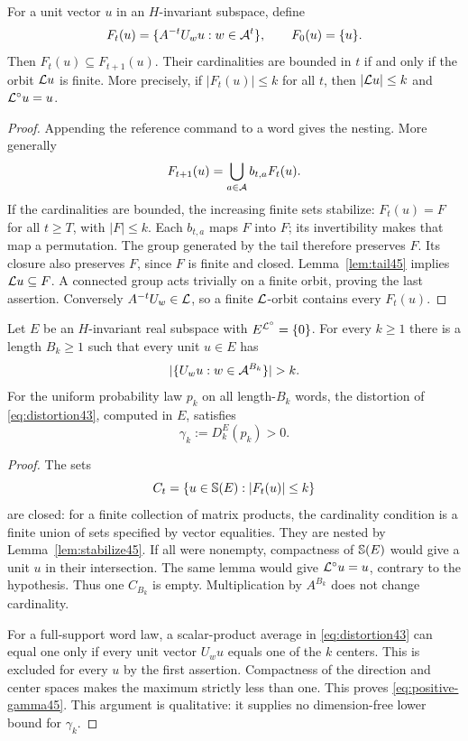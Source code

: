 \begin{lemma}\label{lem:stabilize45}
For a unit vector $u$ in an $H$-invariant subspace, define
\[
 F_t(u)=\{A^{-t}U_wu:w\in\mathcal A^t\},\qquad F_0(u)=\{u\}.
\]
Then $F_t(u)\subseteq F_{t+1}(u)$. Their cardinalities are bounded in $t$ if and only if the orbit $\mathcal L u$ is finite. More precisely, if $|F_t(u)|\le k$ for all $t$, then $|\mathcal L u|\le k$ and $\mathcal L^\circ u=u$.
\end{lemma}
\begin{proof}
Appending the reference command to a word gives the nesting. More generally
\begin{equation}\label{eq:normalized-recursion45}
 F_{t+1}(u)=\bigcup_{a\in\mathcal A}b_{t,a}F_t(u).
\end{equation}
If the cardinalities are bounded, the increasing finite sets stabilize: $F_t(u)=F$ for all $t\ge T$, with $|F|\le k$. Each $b_{t,a}$ maps $F$ into $F$; its invertibility makes that map a permutation. The group generated by the tail therefore preserves $F$. Its closure also preserves $F$, since $F$ is finite and closed. Lemma~\ref{lem:tail45} implies $\mathcal L u\subseteq F$. A connected group acts trivially on a finite orbit, proving the last assertion. Conversely $A^{-t}U_w\in\mathcal L$, so a finite $\mathcal L$-orbit contains every $F_t(u)$.
\end{proof}

\begin{lemma}\label{lem:positive-packet45}
Let $E$ be an $H$-invariant real subspace with $E^{\mathcal L^\circ}=\{0\}$. For every $k\ge1$ there is a length $B_k\ge1$ such that every unit $u\in E$ has
\[
 |\{U_wu:w\in\calA^{B_k}\}|>k.
\]
For the uniform probability law $p_k$ on all length-$B_k$ words, the distortion of \eqref{eq:distortion43}, computed in $E$, satisfies
\begin{equation}\label{eq:positive-gamma45}
 \gamma_k:=D_k^E(p_k)>0.
\end{equation}
\end{lemma}
\begin{proof}
The sets
\[
 C_t=\{u\in\mathbb S(E):|F_t(u)|\le k\}
\]
are closed: for a finite collection of matrix products, the cardinality condition is a finite union of sets specified by vector equalities. They are nested by Lemma~\ref{lem:stabilize45}. If all were nonempty, compactness of $\mathbb S(E)$ would give a unit $u$ in their intersection. The same lemma would give $\mathcal L^\circ u=u$, contrary to the hypothesis. Thus one $C_{B_k}$ is empty. Multiplication by $A^{B_k}$ does not change cardinality.

For a full-support word law, a scalar-product average in \eqref{eq:distortion43} can equal one only if every unit vector $U_wu$ equals one of the $k$ centers. This is excluded for every $u$ by the first assertion. Compactness of the direction and center spaces makes the maximum strictly less than one. This proves \eqref{eq:positive-gamma45}. This argument is qualitative: it supplies no dimension-free lower bound for $\gamma_k$.
\end{proof}

